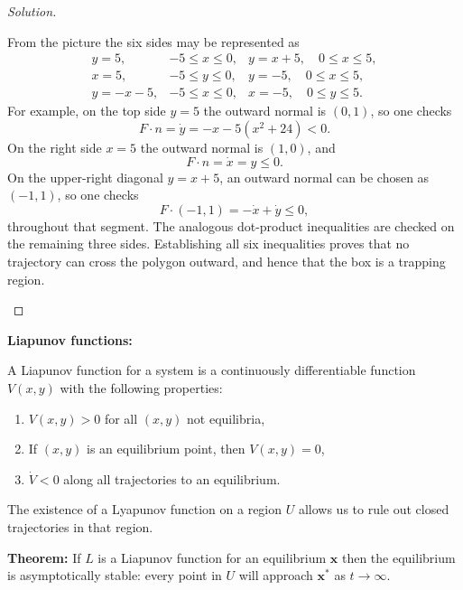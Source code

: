\documentclass[12pt]{amsart}
\theoremstyle{plain}
\theoremstyle{definition}
\theoremstyle{definition}
\theoremstyle{plain}
\newenvironment{solution}
{\begin{proof}[Solution]}
{\end{proof}}
\begin{document}
\begin{enumerate}
\begin{solution}
\begin{enumerate}[label=(\alph*)]
        From the picture the six sides may be represented as
        \[
            \begin{array}{lll}
                y=5, & -5\leq x\leq0, &
                y=x+5,\quad 0\leq x\leq5,\\
                x=5, & -5\leq y\leq0, &
                y=-5,\quad 0\leq x\leq5,\\
                y=-x-5, & -5\leq x\leq0, &
                x=-5,\quad 0\leq y\leq5.
            \end{array}
        \]
        For example, on the top side $y=5$ the outward normal is $(0,1)$, so one
        checks
        \[
            F\cdot n=\dot y=-x-5(x^2+24)<0.
        \]
        On the right side $x=5$ the outward normal is $(1,0)$, and
        \[
            F\cdot n=\dot x=y\leq0.
        \]
        On the upper-right diagonal $y=x+5$, an outward normal can be chosen as
        $(-1,1)$, so one checks
        \[
            F\cdot(-1,1)=-\dot x+\dot y\leq0,
        \]
        throughout that segment. The analogous dot-product inequalities are
        checked on the remaining three sides. Establishing all six inequalities
        proves that no trajectory can cross the polygon outward, and hence that
        the box is a trapping region.
            \end{enumerate}
        \end{solution}

        \medskip
        \noindent\textbf{Liapunov functions:}\par
        A Liapunov function for a system is a continuously differentiable function $V(x,y)$ with the following properties:

        \begin{enumerate}[label=\arabic*.]
        \item $V(x,y)>0$ for all $(x,y)$ not equilibria,
        \item If $(x,y)$ is an equilibrium point, then $V(x,y)=0$,
        \item $\dot V<0$ along all trajectories to an equilibrium.
        \end{enumerate}

        The existence of a Lyapunov function on a region $U$ allows us to rule out closed trajectories in that region.

        \medskip
        \noindent\textbf{Theorem:} If $L$ is a Liapunov function for an equilibrium $\mathbf{x}$ then the equilibrium is asymptotically stable: every point in $U$ will approach $\mathbf{x}^*$ as $t\to\infty$.


\end{enumerate}
\end{document}
